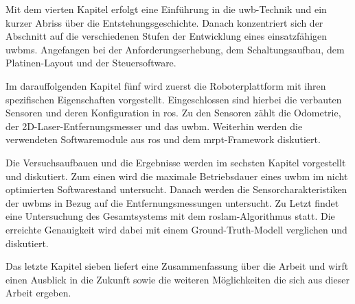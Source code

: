 Mit dem vierten Kapitel erfolgt eine Einführung in die \Gls{uwb}-Technik und ein kurzer Abriss über die Entstehungsgeschichte. Danach konzentriert sich der Abschnitt auf die verschiedenen Stufen der Entwicklung eines einsatzfähigen \Gls{uwbm}s. Angefangen bei der Anforderungserhebung, dem Schaltungsaufbau, dem Platinen-Layout und der Steuersoftware.

Im darauffolgenden Kapitel fünf wird zuerst die Roboterplattform mit ihren spezifischen Eigenschaften vorgestellt. Eingeschlossen sind hierbei die verbauten Sensoren und deren Konfiguration in \Gls{ros}. Zu den Sensoren zählt die Odometrie, der 2D-Laser-Entfernungsmesser und das \Gls{uwbm}. Weiterhin werden die verwendeten Softwaremodule aus \Gls{ros} und dem \Gls{mrpt}-Framework diskutiert.

Die Versuchsaufbauen und die Ergebnisse werden im sechsten Kapitel vorgestellt und diskutiert. Zum einen wird die maximale Betriebsdauer eines \Gls{uwbm} im nicht optimierten Softwarestand untersucht. Danach werden die Sensorcharakteristiken der \Glspl{uwbm} in Bezug auf die Entfernungsmessungen untersucht. Zu Letzt findet eine Untersuchung des Gesamtsystems mit dem \Gls{roslam}-Algorithmus statt. Die erreichte Genauigkeit wird dabei mit einem Ground-Truth-Modell verglichen und diskutiert.

Das letzte Kapitel sieben liefert eine Zusammenfassung über die Arbeit und wirft einen Ausblick in die Zukunft sowie die weiteren Möglichkeiten die sich aus dieser Arbeit ergeben.


